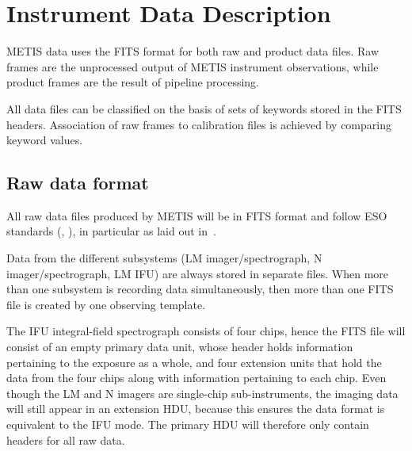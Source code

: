 
\clearpage
\section{Instrument Data Description}
\label{sec:instrument_data_description}

METIS data uses the FITS format for both raw and product data
files. Raw frames are the unprocessed output of METIS instrument
observations, while product frames are the result of pipeline
processing.

All data files can be classified on the basis of sets of keywords
stored in the FITS headers. Association of raw frames to calibration
files is achieved by comparing keyword values.


\subsection{Raw data format}
\label{ssec:instrument_data_format}

All raw data files produced by METIS will be in FITS format and follow
ESO standards (, ), in particular as
laid out in~\cite{ESO-DICD}.

Data from the different subsystems (LM imager/spectrograph, N
imager/spectrograph, LM IFU) are always stored in separate files.
When more than one subsystem is recording data simultaneously, then
more than one FITS file is created by one observing template.

 The IFU
integral-field spectrograph consists of four chips, hence the FITS
file will consist of an empty primary data unit, whose header holds
information pertaining to the exposure as a whole, and four extension
units that hold the data from the four chips along with information
pertaining to each chip.
Even though the LM and N imagers are single-chip sub-instruments, the
imaging data will still appear in an extension HDU, because this ensures
the data format is equivalent to the IFU mode.
The primary HDU will therefore only contain headers for all raw data.

